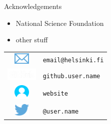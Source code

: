\documentclass[12pt]{beamer}
\begin{document}
\begin{frame}

{\large \textcolor{recRed}{Acknowledgements}}

  \begin{itemize}
    \item National Science Foundation
    \item other stuff
  \end{itemize}

  \begin{flushright}
    \begin{tabular}{cl}
    \includegraphics[width=0.75cm]{figs/email.png} & \texttt{email@helsinki.fi} \\
    \includegraphics[width=1.5cm]{figs/octocat.png} & \texttt{github.user.name} \\
    \includegraphics[width=0.75cm]{figs/user.png} & \texttt{website}\\
    \includegraphics[width=0.75cm]{figs/twitter.png} & \texttt{@user.name} \\
   \end{tabular}
  \end{flushright}
\end{frame}
\end{document}

